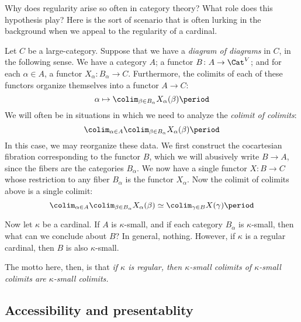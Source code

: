 \begin{eg}
	Why does regularity arise so often in category theory?
	What role does this hypothesis play?
	Here is the sort of scenario that is often
	lurking in the background when we appeal to the
	regularity of a cardinal.

	Let $ C $ be a large-category.
	Suppose that we have a \emph{diagram of diagrams} in $ C $,
	in the following sense.
	We have a category $ A $;
	a functor $ B \colon A \to \Cat^V $;
	and for each $ \alpha \in A $,
	a functor $ X_{\alpha} \colon B_{\alpha} \to C $.
	Furthermore, the colimits of each of these functors
	organize themselves into a functor
	$ A \to C $:
	\[
		\alpha \mapsto \colim_{\beta \in B_{\alpha}}
		X_{\alpha}(\beta) \period
	\]
	We will often be in situations in which
	we need to analyze the \emph{colimit of colimits}:
	\[
		\colim_{\alpha \in A}
		\colim_{\beta \in B_{\alpha}} X_{\alpha}(\beta) \period
	\]
	In this case, we may reorganize these data.
	We first construct the cocartesian fibration
	corresponding to the functor $ B $,
	which we will abusively write $ B \to A $,
	since the fibers are the categories $ B_{\alpha} $.
	We now have a single functor $ X \colon B \to C $
	whose restriction to any fiber $ B_{\alpha} $
	is the functor $ X_{\alpha} $.
	Now the colimit of colimits above is a single colimit:
	\[
		\colim_{\alpha \in A}
		\colim_{\beta \in B_{\alpha}} X_{\alpha}(\beta) \simeq
		\colim_{\gamma \in B} X(\gamma) \period
	\]

	Now let $ \kappa $ be a cardinal.
	If $ A $ is $ \kappa $-small,
	and if each category $ B_{\alpha} $ is $ \kappa $-small,
	then what can we conclude about $ B $?
	In general, nothing.
	However, if $ \kappa $ is a regular cardinal,
	then $ B $ is also $ \kappa $-small.

	The motto here, then, is that
	\emph{%
		if $ \kappa $ is regular,
		then $ \kappa $-small colimits
		of $ \kappa $-small colimits
		are $ \kappa $-small colimits.
	}
\end{eg}

\subsection{Accessibility and presentablity}%
\label{sub:accessibility_and_presentablity}

